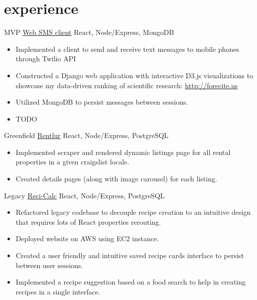
\section{experience}

\begin{entrylist}


\entry
{MVP}
{\href{}{Web SMS client}}
{React, Node/Express, MongoDB}
{\begin{itemize}
\item Implemented a client to send and receive text messages to mobile phones through Twilio API
\item Constructed a Django web application with interactive D3.js visualizations to showcase my data-driven ranking of scientific research: \href{http://forecite.us}{http://forecite.us}
\item Utilized MongoDB to persist messages between sessions.
\item TODO
\end{itemize}}


\entry
{Greenfield}
{\href{}{Rentlur}}
{React, Node/Express, PostgreSQL}
{\begin{itemize}
\item Implemented scraper and rendered dynamic listings page for all rental properties in a given craigslist locale.
\item Created details pages (along with image carousel) for each listing.
\end{itemize}}


\entry
{Legacy}
{\href{https://narrativescience.com/}{Reci-Calc}}
{React, Node/Express, PostgreSQL}
{\begin{itemize}
\item Refactored legacy codebase to decouple recipe creation to an intuitive design that requires lots of React properties rerouting.
\item  Deployed website on AWS using EC2 instance.
\item  Created a user friendly and intuitive saved recipe cards interface to persist between user sessions. 
\item Implemented a recipe suggestion based on a food search to help in creating recipes in a single interface. 
\end{itemize}}


\end{entrylist}
